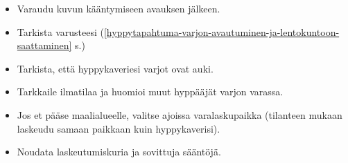 \begin{itemize}
\item  Varaudu kuvun kääntymiseen avauksen jälkeen.  
\item  Tarkista varusteesi (\ref{hyppytapahtuma-varjon-avautuminen-ja-lentokuntoon-saattaminen} s.\pageref{hyppytapahtuma-varjon-avautuminen-ja-lentokuntoon-saattaminen}) 
\item  Tarkista, että hyppykaveriesi varjot ovat auki.  
\item  Tarkkaile ilmatilaa ja huomioi muut hyppääjät varjon varassa.  
\item  Jos et pääse maalialueelle, valitse ajoissa varalaskupaikka (tilanteen mukaan laskeudu samaan paikkaan kuin hyppykaverisi).  
\item  Noudata laskeutumiskuria ja sovittuja sääntöjä. 
\end{itemize}
